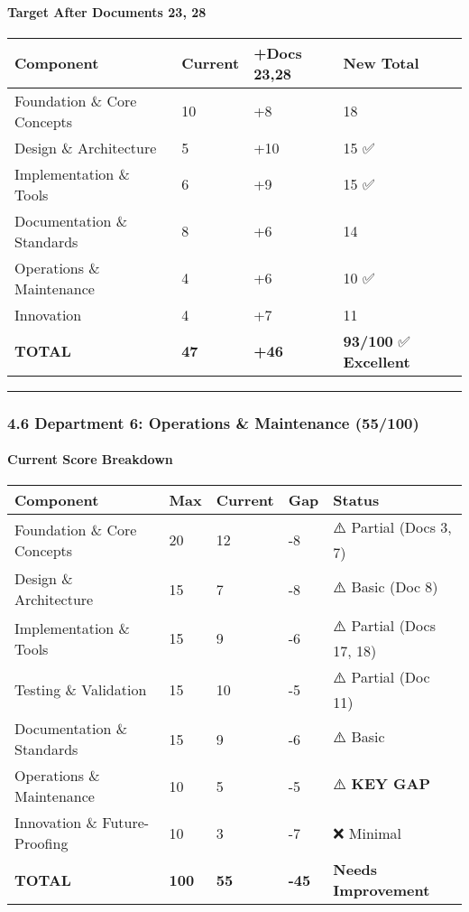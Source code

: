 \documentclass[
]{article}
\begin{document}
\hypertarget{target-after-documents-23-28}{%
\paragraph{Target After Documents 23,
28}\label{target-after-documents-23-28}}

\begin{longtable}[]{@{}llll@{}}
\toprule\noalign{}
Component & Current & +Docs 23,28 & New Total \\
\midrule\noalign{}
\endhead
\bottomrule\noalign{}
\endlastfoot
Foundation \& Core Concepts & 10 & +8 & 18 \\
Design \& Architecture & 5 & +10 & 15 ✅ \\
Implementation \& Tools & 6 & +9 & 15 ✅ \\
Documentation \& Standards & 8 & +6 & 14 \\
Operations \& Maintenance & 4 & +6 & 10 ✅ \\
Innovation & 4 & +7 & 11 \\
\textbf{TOTAL} & \textbf{47} & \textbf{+46} & \textbf{93/100} ✅
\textbf{Excellent} \\
\end{longtable}

\begin{center}\rule{0.5\linewidth}{0.5pt}\end{center}

\hypertarget{department-6-operations-maintenance-55100}{%
\subsubsection{4.6 Department 6: Operations \& Maintenance
(55/100)}\label{department-6-operations-maintenance-55100}}

\hypertarget{current-score-breakdown-5}{%
\paragraph{Current Score Breakdown}\label{current-score-breakdown-5}}

\begin{longtable}[]{@{}lllll@{}}
\toprule\noalign{}
Component & Max & Current & Gap & Status \\
\midrule\noalign{}
\endhead
\bottomrule\noalign{}
\endlastfoot
Foundation \& Core Concepts & 20 & 12 & -8 & ⚠️ Partial (Docs 3, 7) \\
Design \& Architecture & 15 & 7 & -8 & ⚠️ Basic (Doc 8) \\
Implementation \& Tools & 15 & 9 & -6 & ⚠️ Partial (Docs 17, 18) \\
Testing \& Validation & 15 & 10 & -5 & ⚠️ Partial (Doc 11) \\
Documentation \& Standards & 15 & 9 & -6 & ⚠️ Basic \\
Operations \& Maintenance & 10 & 5 & -5 & ⚠️ \textbf{KEY GAP} \\
Innovation \& Future-Proofing & 10 & 3 & -7 & ❌ Minimal \\
\textbf{TOTAL} & \textbf{100} & \textbf{55} & \textbf{-45} &
\textbf{Needs Improvement} \\
\end{longtable}
\end{document}
